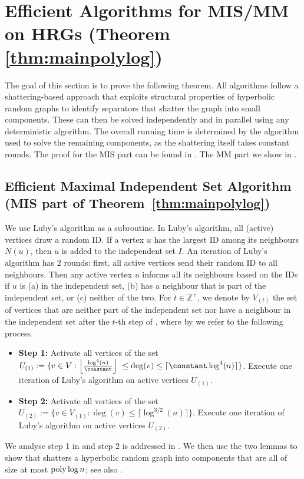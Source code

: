 \documentclass[letterpaper,11pt]{article}
\newcommand{\poly}{\operatorname{\text{{\rm poly}}}}
\newcommand{\1}{\mathbb I}
\begin{document}
\section{Efficient Algorithms for MIS/MM on HRGs (Theorem \ref{thm:mainpolylog})}\label{sec:shattering-algos}
The goal of this section is to prove the following theorem. 
%
\maintheorem*
%
All algorithms follow a shattering-based approach that exploits structural properties of hyperbolic random graphs to identify separators that shatter the graph into small components. These can then be solved independently and in parallel using any deterministic algorithm. The overall running time is determined by the algorithm used to solve the remaining components, as the shattering itself takes constant rounds. The proof for the MIS part can be found in . The MM part we show in .
%
\subsection{Efficient Maximal Independent Set Algorithm (MIS part of Theorem~\ref{thm:mainpolylog})}\label{sec:cheddar}
%
We use Luby's algorithm as a subroutine. In Luby's algorithm, all (active) vertices draw a random ID. If a vertex $u$ has the largest ID among its neighbours $N(u)$, then $u$ is added to the independent set $I$. An iteration of Luby's algorithm has $2$ rounds: first, all active vertices send their random ID to all neighbours. Then any active vertex $u$ informs all its neighbours based on the IDs if $u$ is (a) in the independent set, (b) has a neighbour that is part of the independent set, or (c) neither of the two. For $t \in \mathbb{Z}^+$, we denote by $V_{(t)}$ the set of vertices that are neither part of the independent set nor have a neighbour in the independent set after the $t$-th step of \emph{\algo}, where by \algo we refer to the following process.
%
\begin{tcolorbox}
\begin{itemize}
    \item \textbf{Step 1:} Activate all vertices of the set $U_{(1)} : = \{v \in V : \left\lfloor\frac{\log^{4}(n)}{\constant}\right\rfloor\ \leq \deg(v) \leq \lceil\constant \log^{4}(n) \rceil\}$. Execute one iteration of Luby's algorithm on active vertices $U_{(1)}$.
    \item \textbf{Step 2:} Activate all vertices of the set $U_{(2)} := \{v \in V_{(1)} : \deg(v) \leq \lceil \log^{3/2}(n)\rceil\}$. Execute one iteration of Luby's algorithm on active vertices $U_{(2)}$.
\end{itemize}
\end{tcolorbox}
%
We analyse step 1 in  and step 2 is addressed in . We then use the two lemmas to show that {\algo} shatters a hyperbolic random graph into components that are all of size at most $\poly\log n$; see also .
\end{document}

